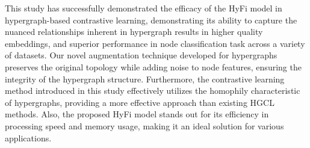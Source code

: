 This study has successfully demonstrated the efficacy of the HyFi model in hypergraph-based contrastive learning, demonstrating its ability to capture the nuanced relationships inherent in hypergraph results in higher quality embeddings, and superior performance in node classification task across a variety of datasets. Our novel augmentation technique developed for hypergraphs preserves the original topology while adding noise to node features, ensuring the integrity of the hypergraph structure. Furthermore, the contrastive learning method introduced in this study effectively utilizes the homophily characteristic of hypergraphs, providing a more effective approach than existing HGCL methods. Also, the proposed HyFi model stands out for its efficiency in processing speed and memory usage, making it an ideal solution for various applications. 

